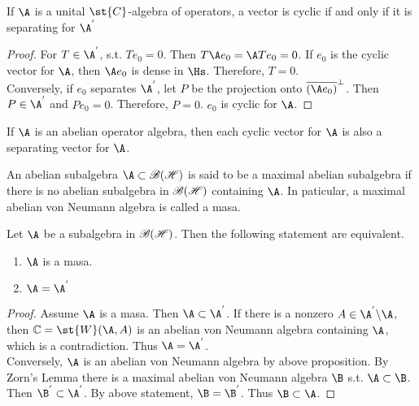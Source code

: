 \begin{prop}
	If $\A$ is a unital $\st{C}$-algebra of operators, a vector is cyclic if and only if it is separating for $\A^{'}$
\end{prop}
\begin{proof}
	For $T \in \A^{'}$, s.t. $Te_0 = 0$. Then $T \A e_0 = \A T e_0 =  0$. If $e_0$ is the cyclic vector for $\A$, then $\A e_0$ is dense in $\Hs$. Therefore, $T=0$.\\
	Conversely, if $e_0$ separates $\A^{'}$, let $P$ be the projection onto $\clo{(\A e_0)}^{\bot}$. Then $P \in \A^{'}$ and $P e_0 = 0$. Therefore, $P = 0$. $e_0$ is cyclic for $\A$. 
\end{proof}
\begin{cor}
	If $\A$ is an abelian operator algebra, then each cyclic vector for $\A$ is also a separating vector for $\A$.
\end{cor}

\begin{defn}
	An abelian subalgebra $\A \subset \oper$ is said to be a maximal abelian subalgebra if there is no abelian subalgebra in $\mathscr{B(H)}$ containing $\A$. In paticular, a maximal abelian von Neumann algebra is called a masa.
\end{defn}

\begin{thm}
	Let $\A$ be a subalgebra in $\mathscr{B(H)}$. Then the following statement are equivalent.
	\begin{enumerate}[label=\arabic*)]
		\item  $\A$ is a masa.
		\item $\A = \A^{'}$
	\end{enumerate}
\end{thm}
\begin{proof}
	Assume $\A$ is a masa. Then $\A \subset \A^{'}$. If there is a nonzero $A \in \A^{'} \backslash \A$, then $\C = \st{W}(\A,A)$ is an abelian von Neumann algebra containing $\A$, which is a contradiction. Thus $\A = \A^{'}$.\\
	Conversely, $\A$ is an abelian von Neumann algebra by above proposition. By Zorn's Lemma there is a maximal abelian von Neumann algebra $\B$ s.t. $\A \subset \B$. Then $\B^{'} \subset \A^{'}$. By above statement, $\B = \B^{'}$. Thus $\B \subset \A$.
\end{proof}

